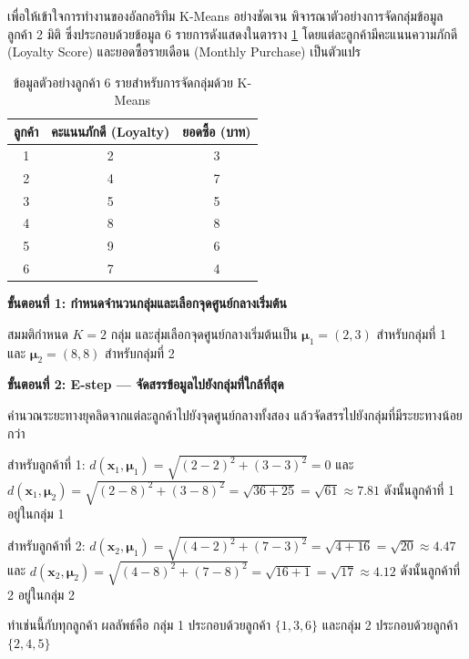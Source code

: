 \begin{exmp}
เพื่อให้เข้าใจการทำงานของอัลกอริทึม K-Means อย่างชัดเจน พิจารณาตัวอย่างการจัดกลุ่มข้อมูลลูกค้า 2 มิติ ซึ่งประกอบด้วยข้อมูล 6 รายการดังแสดงในตาราง \ref{tab:kmeans_data} โดยแต่ละลูกค้ามีคะแนนความภักดี (Loyalty Score) และยอดซื้อรายเดือน (Monthly Purchase) เป็นตัวแปร

\begin{table}[h!]
    \centering
    \caption{ข้อมูลตัวอย่างลูกค้า 6 รายสำหรับการจัดกลุ่มด้วย K-Means}
    \label{tab:kmeans_data}
    \begin{tabular}{|c|c|c|}
        \hline
        \textbf{ลูกค้า} & \textbf{คะแนนภักดี (Loyalty)} & \textbf{ยอดซื้อ (บาท)} \\
        \hline
        1 & 2 & 3 \\
        \hline
        2 & 4 & 7 \\
        \hline
        3 & 5 & 5 \\
        \hline
        4 & 8 & 8 \\
        \hline
        5 & 9 & 6 \\
        \hline
        6 & 7 & 4 \\
        \hline
    \end{tabular}
\end{table}

\textbf{ขั้นตอนที่ 1: กำหนดจำนวนกลุ่มและเลือกจุดศูนย์กลางเริ่มต้น}

สมมติกำหนด $K = 2$ กลุ่ม และสุ่มเลือกจุดศูนย์กลางเริ่มต้นเป็น $\boldsymbol{\mu}_1 = (2, 3)$ สำหรับกลุ่มที่ 1 และ $\boldsymbol{\mu}_2 = (8, 8)$ สำหรับกลุ่มที่ 2

\textbf{ขั้นตอนที่ 2: E-step --- จัดสรรข้อมูลไปยังกลุ่มที่ใกล้ที่สุด}

คำนวณระยะทางยุคลิดจากแต่ละลูกค้าไปยังจุดศูนย์กลางทั้งสอง แล้วจัดสรรไปยังกลุ่มที่มีระยะทางน้อยกว่า

สำหรับลูกค้าที่ 1: $d(\mathbf{x}_1, \boldsymbol{\mu}_1) = \sqrt{(2-2)^2 + (3-3)^2} = 0$ และ $d(\mathbf{x}_1, \boldsymbol{\mu}_2) = \sqrt{(2-8)^2 + (3-8)^2} = \sqrt{36+25} = \sqrt{61} \approx 7.81$ ดังนั้นลูกค้าที่ 1 อยู่ในกลุ่ม 1

สำหรับลูกค้าที่ 2: $d(\mathbf{x}_2, \boldsymbol{\mu}_1) = \sqrt{(4-2)^2 + (7-3)^2} = \sqrt{4+16} = \sqrt{20} \approx 4.47$ และ $d(\mathbf{x}_2, \boldsymbol{\mu}_2) = \sqrt{(4-8)^2 + (7-8)^2} = \sqrt{16+1} = \sqrt{17} \approx 4.12$ ดังนั้นลูกค้าที่ 2 อยู่ในกลุ่ม 2

ทำเช่นนี้กับทุกลูกค้า ผลลัพธ์คือ กลุ่ม 1 ประกอบด้วยลูกค้า $\{1, 3, 6\}$ และกลุ่ม 2 ประกอบด้วยลูกค้า $\{2, 4, 5\}$


\end{exmp}

